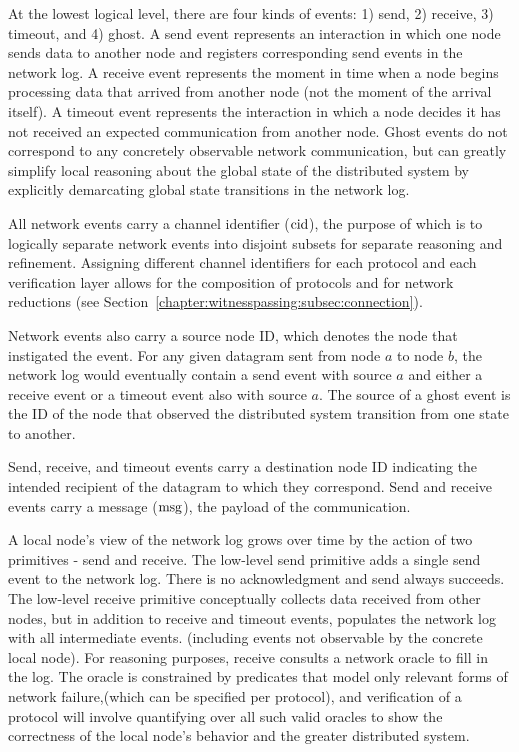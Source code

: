 At the lowest logical level, there are four kinds of events: 1) send, 2) receive,
3) timeout, and 4) ghost. A send event represents an interaction in which one
node sends data to another node and registers corresponding send events in the
network log. A receive event represents the moment in time when a node begins
processing data that arrived from another node (not the moment of the arrival
itself). A timeout event represents the interaction in which a node decides it
has not received an expected communication from another node. Ghost events do
not correspond to any concretely observable network communication, but can
greatly simplify local reasoning about the global state of the distributed
system by explicitly demarcating global state transitions in the network log.

All network events carry a channel identifier ($\mathrm{cid}$), the purpose of which is
to logically separate network events into disjoint subsets for separate
reasoning and refinement. Assigning different channel identifiers for each
protocol and each verification layer allows for the composition of protocols and
for network reductions (see Section~\ref{chapter:witnesspassing:subsec:connection}).

Network events also carry a source node ID, which denotes the node that
instigated the event. For any given datagram sent from node $a$ to node $b$, the
network log would eventually contain a send event with source $a$ and either a
receive event or a timeout event also with source $a$. The source of a ghost
event is the ID of the node that observed the distributed system transition from
one state to another.  Send, receive, and timeout events carry a
destination node ID indicating the intended recipient of the datagram to which
they correspond. Send and receive events carry a message ($\mathrm{msg}$), the payload
of the communication.

A local node's view of the network log grows over time by the action of two
primitives - send and receive. The low-level send primitive adds a single send
event to the network log. There is no acknowledgment and send always succeeds.
The low-level receive primitive conceptually collects data received from other
nodes, but in addition to receive and timeout events, populates the network log
with all intermediate events. (including events not observable by the
concrete local node). For reasoning purposes, receive consults a network oracle
to fill in the log. The oracle is constrained by predicates that model only
relevant forms of network failure,(which can be specified per protocol), and
verification of a protocol will involve quantifying over all such valid oracles
to show the correctness of the local node's behavior and the greater distributed
system.


